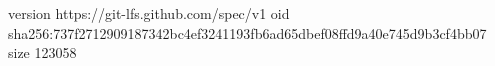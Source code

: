 version https://git-lfs.github.com/spec/v1
oid sha256:737f2712909187342bc4ef3241193fb6ad65dbef08ffd9a40e745d9b3cf4bb07
size 123058
